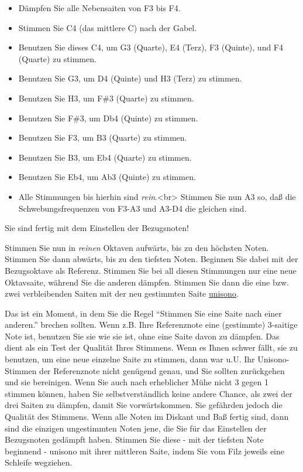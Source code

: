 \begin{itemize} 
 \item Dämpfen Sie alle Nebensaiten von F3 bis F4.
 \item Stimmen Sie C4 (das mittlere C) nach der Gabel.
 \item Benutzen Sie dieses C4, um G3 (Quarte), E4 (Terz), F3 (Quinte), und F4 (Quarte) zu stimmen.
 \item Benutzen Sie G3, um D4 (Quinte) und H3 (Terz) zu stimmen.
 \item Benutzen Sie H3, um F\#3 (Quarte) zu stimmen.
 \item Benutzen Sie F\#3, um Db4 (Quinte) zu stimmen.
 \item Benutzen Sie F3, um B3 (Quarte) zu stimmen.
 \item Benutzen Sie B3, um Eb4 (Quarte) zu stimmen.
 \item Benutzen Sie Eb4, um Ab3 (Quinte) zu stimmen.
 \item Alle Stimmungen bis hierhin sind \textit{rein}.<br>
Stimmen Sie nun A3 so, daß die Schwebungsfrequenzen von F3-A3 und A3-D4 die gleichen sind.
\end{itemize}

Sie sind fertig mit dem Einstellen der Bezugsnoten!


\label{c2_6_kirn2}

Stimmen Sie nun in \textit{reinen} Oktaven aufwärts, bis zu den höchsten Noten.
Stimmen Sie dann abwärts, bis zu den tiefsten Noten.
Beginnen Sie dabei mit der Bezugsoktave als Referenz.
Stimmen Sie bei all diesen Stimmungen nur eine neue Oktavsaite, während Sie die anderen dämpfen.
Stimmen Sie dann die eine bzw. zwei verbleibenden Saiten mit der neu gestimmten Saite \hyperref[c2_5_unis]{unisono}.

Das ist ein Moment, in dem Sie die Regel \enquote{Stimmen Sie eine Saite nach einer anderen.} brechen sollten.
Wenn z.B. Ihre Referenznote eine (gestimmte) 3-saitige Note ist, benutzen Sie sie wie sie ist, ohne eine Saite davon zu dämpfen.
Das dient als ein Test der Qualität Ihres Stimmens.
Wenn es Ihnen schwer fällt, sie zu benutzen, um eine neue einzelne Saite zu stimmen, dann war u.U. Ihr Unisono-Stimmen der Referenznote nicht genügend genau, und Sie sollten zurückgehen und sie bereinigen.
Wenn Sie auch nach erheblicher Mühe nicht 3 gegen 1 stimmen können, haben Sie selbstverständlich keine andere Chance, als zwei der drei Saiten zu dämpfen, damit Sie vorwärtskommen.
Sie gefährden jedoch die Qualität des Stimmens.
Wenn alle Noten im Diskant und Baß fertig sind, dann sind die einzigen ungestimmten Noten jene, die Sie für das Einstellen der Bezugsnoten gedämpft haben.
Stimmen Sie diese - mit der tiefsten Note beginnend - unisono mit ihrer mittleren Saite, indem Sie vom Filz jeweils eine Schleife wegziehen.
 

